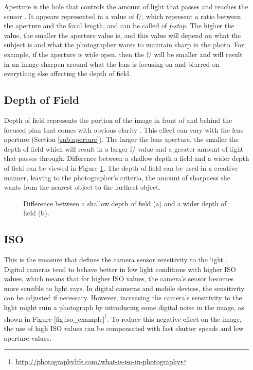 Aperture is the hole that controls the amount of light that passes and reaches the sensor \cite{kamps2012rules, Santos}. It appears represented in a value of f/, which represent a ratio between the aperture and the focal length, and can be called of \emph{f-stop}. The higher the value, the smaller the aperture value is, and this value will depend on what the subject is and what the photographer wants to maintain sharp in the photo. For example, if the aperture is wide open, then the f/ will be smaller and will result in an image sharpen around what the lens is focusing on and blurred on everything else affecting the depth of field.

\subsection{Depth of Field}
\label{sub:depth_field}

Depth of field represents the portion of the image in front of and behind the focused plan that comes with obvious clarity \cite{kamps2012rules, Santos}. This effect can vary with the lens aperture (Section \ref{sub:aperture}). The larger the lens aperture, the smaller the depth of field which will result in a larger f/ value and a greater amount of light that passes through. Difference between a shallow depth a field and a wider depth of field can be viewed in Figure \ref{fig:depth_field_example}.
The depth of field can be used in a creative manner, leaving to the  photographer's criteria, the amount of sharpness she wants from the nearest object to the farthest object.

\begin{figure}[htbp]
        \centering
  \caption{Difference between a shallow depth of field (a) and a wider depth of field (b). \cite{kamps2012rules}}
  \label{fig:depth_field_example}
\end{figure}

\subsection{ISO}
\label{sub:iso}

This is the measure that defines the camera sensor sensitivity to the light \cite{kamps2012rules}. Digital cameras tend to behave better in low light conditions with higher ISO values, which means that for higher ISO values, the camera's sensor becomes more sensible to light rays.
In digital cameras and mobile devices, the sensitivity can be adjusted if necessary. However, increasing the camera's sensitivity to the light might ruin a photograph by introducing some digital noise in the image, as shown in Figure \ref{fig:iso_example}\footnote{\url{http://photographylife.com/what-is-iso-in-photography}}. To reduce this negative effect on the image, the use of high ISO values can be compensated with fast shutter speeds and low aperture values.

